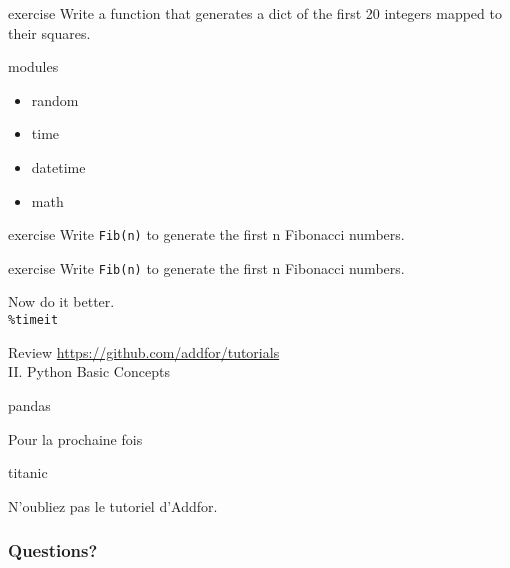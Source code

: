 \begin{frame}{exercise}
  Write a function that generates a dict of the first 20 integers
  mapped to their squares.
\end{frame}

\begin{frame}{modules}
  \begin{itemize}
  \item random
  \item time
  \item datetime
  \item math
  \end{itemize}
\end{frame}

\begin{frame}{exercise}
  Write \texttt{Fib(n)} to generate the first n Fibonacci numbers.
\end{frame}

\begin{frame}{exercise}
  Write \texttt{Fib(n)} to generate the first n Fibonacci numbers.

  Now do it better.\\
  \texttt{\%timeit}
\end{frame}

\begin{frame}{Review}
  \url{https://github.com/addfor/tutorials}\\[2mm]

  \vspace{1mm}
  \hspace{5mm} II. Python Basic Concepts
\end{frame}

\begin{frame}{pandas}
\end{frame}

\begin{frame}{Pour la prochaine fois}

  \vspace{1cm}
  \centerline{titanic}

  \bigskip
  \centerline{N'oubliez pas le tutoriel d'Addfor.}
\end{frame}


\begin{frame}
  \frametitle{Questions?}
\end{frame}


